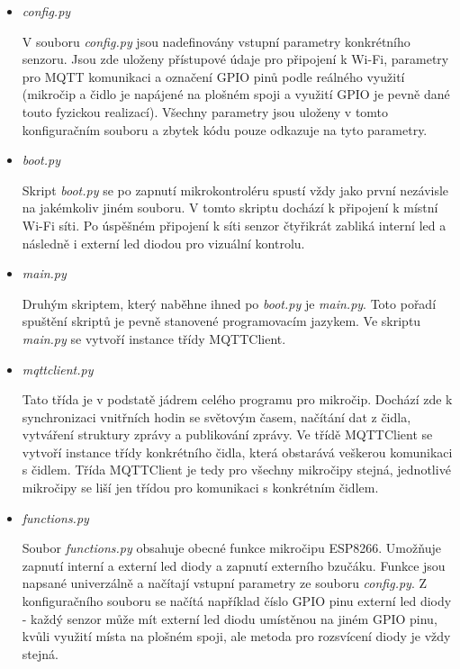 \begin{itemize}
  \item \textit{config.py} 
  
V souboru \textit{config.py} jsou nadefinovány vstupní parametry konkrétního senzoru. Jsou zde uloženy přístupové údaje pro připojení k Wi-Fi, parametry pro MQTT komunikaci a označení GPIO pinů podle reálného využití (mikročip a čidlo je napájené na plošném spoji a využití GPIO je pevně dané touto fyzickou realizací). Všechny parametry jsou uloženy v tomto konfiguračním souboru a zbytek kódu pouze odkazuje na tyto parametry.  
  
  \item \textit{boot.py}
  
Skript \textit{boot.py} se po zapnutí mikrokontroléru spustí vždy jako první nezávisle na jakémkoliv jiném souboru. V tomto skriptu dochází k připojení k místní Wi-Fi síti. Po úspěšném připojení k síti senzor čtyřikrát zabliká interní led a následně i externí led diodou pro vizuální kontrolu.  
  
  \item \textit{main.py}
 
Druhým skriptem, který naběhne ihned po \textit{boot.py} je \textit{main.py}. Toto pořadí spuštění skriptů je pevně stanovené programovacím jazykem. Ve skriptu \textit{main.py} se vytvoří instance třídy MQTTClient. 
  
  \item \textit{mqttclient.py}
  
Tato třída je v podstatě jádrem celého programu pro mikročip. Dochází zde k synchronizaci vnitřních hodin se světovým časem, načítání dat z čidla, vytváření struktury zprávy a publikování zprávy. Ve třídě MQTTClient se vytvoří instance třídy konkrétního čidla, která obstarává veškerou komunikaci s čidlem. Třída MQTTClient je tedy pro všechny mikročipy stejná, jednotlivé mikročipy se liší jen třídou pro komunikaci s konkrétním čidlem.   
  
  \item \textit{functions.py}
  
Soubor \textit{functions.py} obsahuje obecné funkce mikročipu ESP8266. Umožňuje zapnutí interní a externí led diody a zapnutí externího bzučáku. Funkce jsou napsané univerzálně a načítají vstupní parametry ze souboru \textit{config.py}. Z konfiguračního souboru se načítá například číslo GPIO pinu externí led diody - každý senzor může mít externí led diodu umístěnou na jiném GPIO pinu, kvůli využití místa na plošném spoji, ale metoda pro rozsvícení diody je vždy stejná.  
\end{itemize} 
 
